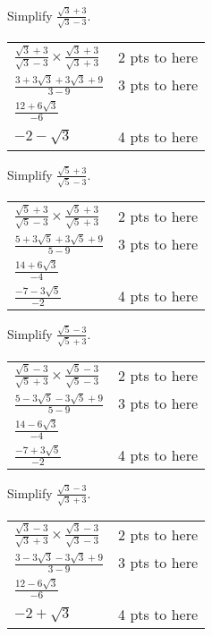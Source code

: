{
	Simplify $\displaystyle \frac{\sqrt{3}+3}{\sqrt{3}-3}$.
}
{
	\begin{tabular}{l r}
	$\frac{\sqrt{3}+3}{\sqrt{3}-3} \times \frac{\sqrt{3}+3}{\sqrt{3}+3}$ & 2 pts  to here\\
	$\frac{3+3\sqrt{3}+3\sqrt{3}+9}{3-9}$ & 3 pts to here\\
	$\frac{12+6\sqrt{3}}{-6}$ \\
	$-2-\sqrt{3}$ & 4 pts to here \\
	\end{tabular}
}

{
	Simplify $\displaystyle \frac{\sqrt{5}+3}{\sqrt{5}-3}$.
}
{
	\begin{tabular}{l r}
	$\frac{\sqrt{5}+3}{\sqrt{5}-3} \times \frac{\sqrt{5}+3}{\sqrt{5}+3}$ & 2 pts  to here\\
	$\frac{5+3\sqrt{5}+3\sqrt{5}+9}{5-9}$ & 3 pts to here\\
	$\frac{14+6\sqrt{3}}{-4}$ \\
	$\frac{-7-3\sqrt{5}}{-2}$ & 4 pts to here \\
	\end{tabular}
}

{
	Simplify $\displaystyle \frac{\sqrt{5}-3}{\sqrt{5}+3}$.
}
{
	\begin{tabular}{l r}
	$\frac{\sqrt{5}-3}{\sqrt{5}+3} \times \frac{\sqrt{5}-3}{\sqrt{5}-3}$ & 2 pts  to here\\
	$\frac{5-3\sqrt{5}-3\sqrt{5}+9}{5-9}$ & 3 pts to here\\
	$\frac{14-6\sqrt{3}}{-4}$ \\
	$\frac{-7+3\sqrt{5}}{-2}$ & 4 pts to here \\
	\end{tabular}
}

{
	Simplify $\displaystyle \frac{\sqrt{3}-3}{\sqrt{3}+3}$.
}
{
	\begin{tabular}{l r}
	$\frac{\sqrt{3}-3}{\sqrt{3}+3} \times \frac{\sqrt{3}-3}{\sqrt{3}-3}$ & 2 pts  to here\\
	$\frac{3-3\sqrt{3}-3\sqrt{3}+9}{3-9}$ & 3 pts to here\\
	$\frac{12-6\sqrt{3}}{-6}$ \\
	$-2+\sqrt{3}$ & 4 pts to here \\
	\end{tabular}
}
